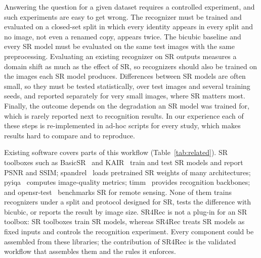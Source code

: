 \documentclass[preprint,12pt]{elsarticle}
\begin{document}
Answering the question for a given dataset requires a controlled experiment, and such experiments are
easy to get wrong. The recognizer must be trained and evaluated on a closed-set split in which every
identity appears in every split and no image, not even a renamed copy, appears twice. The bicubic
baseline and every SR model must be evaluated on the same test images with the same preprocessing.
Evaluating an existing recognizer on SR outputs measures a domain shift as much as the effect of SR,
so recognizers should also be trained on the images each SR model produces. Differences between SR
models are often small, so they must be tested statistically, over test images and several training
seeds, and reported separately for very small images, where SR matters most. Finally, the outcome
depends on the degradation an SR model was trained for, which is rarely reported next to recognition
results. In our experience each of these steps is re-implemented in ad-hoc scripts for every study,
which makes results hard to compare and to reproduce.

Existing software covers parts of this workflow (Table~\ref{tab:related}). SR toolboxes such as
BasicSR~\cite{basicsr} and KAIR~\cite{kair} train and test SR models and report PSNR and SSIM;
spandrel~\cite{spandrel} loads pretrained SR weights of many architectures; pyiqa~\cite{pyiqa}
computes image-quality metrics; timm~\cite{wightman2019timm} provides recognition backbones; and
opensr-test~\cite{aybar2024opensrtest} benchmarks SR for remote sensing. None of them trains
recognizers under a split and protocol designed for SR, tests the difference with bicubic, or
reports the result by image size. SR4Rec is not a plug-in for an SR toolbox: SR toolboxes train SR
models, whereas SR4Rec treats SR models as fixed inputs and controls the recognition experiment.
Every component could be assembled from these libraries; the contribution of SR4Rec is the
validated workflow that assembles them and the rules it enforces.
\end{document}
